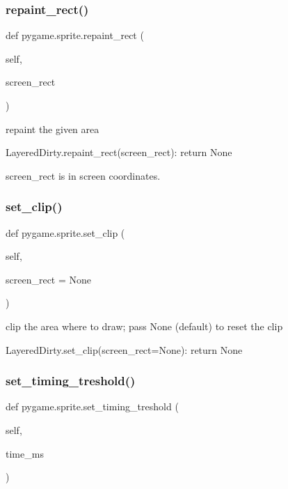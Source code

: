 \subsubsection{\texorpdfstring{repaint\+\_\+rect()}{repaint\_rect()}}
{\footnotesize\ttfamily def pygame.\+sprite.\+repaint\+\_\+rect (\begin{DoxyParamCaption}\item[{}]{self,  }\item[{}]{screen\+\_\+rect }\end{DoxyParamCaption})}

\begin{DoxyVerb}repaint the given area

LayeredDirty.repaint_rect(screen_rect): return None

screen_rect is in screen coordinates.\end{DoxyVerb}
 \mbox{\label{namespacepygame_1_1sprite_a2724cd881e8ebb2a5f1f01e9d641a7f2}} 
\subsubsection{\texorpdfstring{set\+\_\+clip()}{set\_clip()}}
{\footnotesize\ttfamily def pygame.\+sprite.\+set\+\_\+clip (\begin{DoxyParamCaption}\item[{}]{self,  }\item[{}]{screen\+\_\+rect = {\ttfamily None} }\end{DoxyParamCaption})}

\begin{DoxyVerb}clip the area where to draw; pass None (default) to reset the clip

LayeredDirty.set_clip(screen_rect=None): return None\end{DoxyVerb}
 \mbox{\label{namespacepygame_1_1sprite_a900a993afbcd946ffcd9af8f54154b8f}} 
\subsubsection{\texorpdfstring{set\+\_\+timing\+\_\+treshold()}{set\_timing\_treshold()}}
{\footnotesize\ttfamily def pygame.\+sprite.\+set\+\_\+timing\+\_\+treshold (\begin{DoxyParamCaption}\item[{}]{self,  }\item[{}]{time\+\_\+ms }\end{DoxyParamCaption})}

